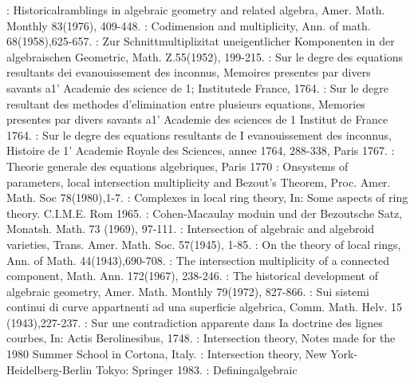 \begin{thebibliography}{99}
:  Historical\pageoriginale ramblings in algebraic
  geometry and related algebra, Amer. Math. Monthly 83(1976),
  409-448. 
:   Codimension and
  multiplicity, Ann. of math. 68(1958),625-657. 
:   Zur Schnittmultiplizitat uneigentlicher
  Komponenten in der algebraischen Geometric, Math. Z.55(1952),
  199-215. 
:   Sur le degre des equations resultants dei
  evanouissement des inconnus, Memoires presentes par divers savants
  a1' Academie des science de 1; Institutede France, 1764. 
:   Sur le degre resultant des methodes
  d'elimination entre plusieurs equations, Memories presentes par
  divers savants a1' Academie des sciences de 1 Institut de France
  1764.  
:   Sur le degre des equations resultants de
  I evanouissement des inconnus, Histoire de 1' Academie Royale
  des Sciences, annee 1764, 288-338, Paris 1767. 
:  Theorie generale des equations algebriques,
  Paris 1770 
: On\pageoriginale systems of parameters, local
  intersection multiplicity and Bezout's Theorem,
  Proc. Amer. Math. Soc 78(1980),1-7. 
:  Complexes in local ring theory, In:
  Some aspects of ring theory. C.I.M.E. Rom 1965. 
:   Cohen-Macaulay moduin und
  der Bezoutsche Satz, Monatsh. Math. 73 (1969), 97-111. 
:   Intersection of algebraic and
  algebroid varieties, Trans. Amer. Math. Soc. 57(1945), 1-85. 
:   On the theory of local rings, Ann. of
  Math.  44(1943),690-708. 
:   The intersection multiplicity of a
  connected component, Math. Ann. 172(1967), 238-246. 
:   The historical development of
  algebraic geometry, Amer. Math. Monthly 79(1972), 827-866.  
:   Sui sistemi continui di curve
  appartnenti ad una superficie algebrica, Comm. Math. Helv. 15
  (1943),227-237. 
:   Sur une contradiction apparente dans Ia
  doctrine des lignes courbes, In: Actis Berolinesibus, 1748. 
:  Intersection theory, Notes made for the
  1980 Summer School in Cortona, Italy. 
:   Intersection theory, New
  York-Heidelberg-Berlin Tokyo:   Springer 1983. 
: Defining\pageoriginale algebraic

\end{thebibliography}
